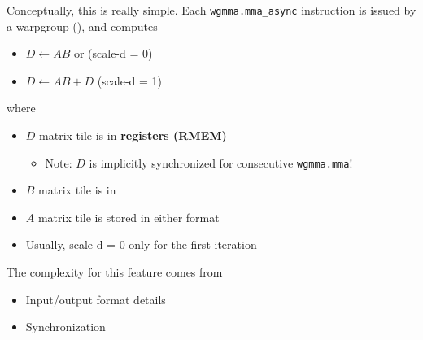\newpage
{}

\begin{minipage}[t]{0.48\textwidth}\fixminipage
Conceptually, this is really simple.
Each \texttt{wgmma.mma\_async} instruction is issued by a warpgroup (), and computes
\begin{itemize}
  \item $D \leftarrow AB$ or \hfill (scale-d = 0)
  \item $D \leftarrow AB + D$ \hfill (scale-d = 1)
\end{itemize}
where
\begin{itemize}
  \item $D$ matrix tile is in \textbf{registers (RMEM)}
  \begin{itemize}
    \item Note: $D$ is implicitly synchronized for consecutive \texttt{wgmma.mma}!
  \end{itemize}
  \item $B$ matrix tile is in 
  \item $A$ matrix tile is stored in either format
  \item Usually, scale-d = 0 only for the first iteration
\end{itemize}

The complexity for this feature comes from
\begin{itemize}
  \item Input/output format details 
  \item Synchronization
\end{itemize}
\end{minipage}%
\hfill
